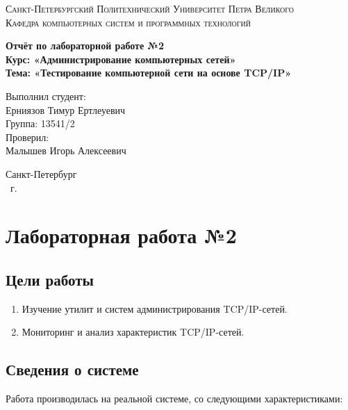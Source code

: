 \documentclass[14pt,a4paper,report]{report}
\begin{document}
\def\contentsname{Содержание}

\begin{titlepage}
	\begin{center}
		\textsc{Санкт-Петербургский Политехнический 
			Университет Петра Великого\\[5mm]
			Кафедра компьютерных систем и программных технологий}
		
		\vfill
		
		\textbf{Отчёт по лабораторной работе №2\\[3mm]
			Курс: «Администрирование компьютерных сетей»\\[3mm]
			Тема: «Тестирование компьютерной сети на основе TCP/IP»\\[35mm]
			}
	\end{center}
	
	\hfill
	\begin{minipage}{.5\textwidth}
		Выполнил студент:\\[2mm] 
		Ерниязов Тимур Ертлеуевич\\
		Группа: 13541/2\\[5mm]
		
		Проверил:\\[2mm] 
		Малышев Игорь Алексеевич
	\end{minipage}
	\vfill
	\begin{center}
		Санкт-Петербург\\ \the\year\ г.
	\end{center}
\end{titlepage}

\tableofcontents
\clearpage
\chapter{Лабораторная работа №2}
\section{Цели работы}
\begin{enumerate}
\item Изучение утилит и систем администрирования TCP/IP-сетей.
\item Мониторинг и анализ характеристик TCP/IP-сетей.
\end{enumerate}

\section{Сведения о системе}
Работа производилась на реальной системе, со следующими характеристиками:
\end{document}
